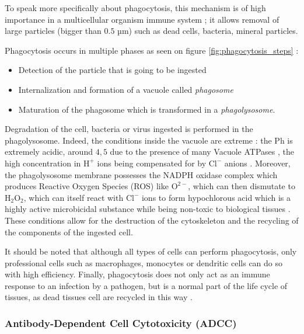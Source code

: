 To speak more specifically about phagocytosis, this mechanism is of high importance
in a multicellular organism immune system ; it allows removal of large particles
(bigger than $0.5$ µm) such as dead cells, bacteria, mineral particles.

Phagocytosis occurs in multiple phases \cite{uribe-querol_phagocytosis_2020}
as seen on figure \ref{fig:phagocytosis_steps} : 
\begin{itemize}
    \item Detection of the particle that is going to be ingested
    \item Internalization and formation of a vacuole called \emph{phagosome}
    \item Maturation of the phagosome which is transformed in a \emph{phagolysosome}.
\end{itemize}

Degradation of the cell, bacteria or virus ingested is performed in the phagolysosome.
Indeed, the conditions inside the vacuole are extreme : the Ph is extremely acidic,
around $4,5$ due to the presence of many Vacuole ATPases \cite{uribe-querol_phagocytosis_2020},
the high concentration in $\text{H}^+$ ions being compensated for
by $\text{Cl}^-$ anions \cite{gordon_phagocytosis_2016}. 
Moreover, the phagolysosome membrane possesses the NADPH oxidase complex 
which produces Reactive Oxygen Species (ROS) like $\text{O}^{2-}$, which can then
dismutate to $\text{H}_2\text{O}_2$, which can itself react with $\text{Cl}^-$ ions
to form hypochlorous acid which is a highly active microbicidal substance while
being non-toxic to biological tissues \cite{eryilmaz_antimicrobial_2013}.
These conditions allow for the destruction of the cytoskeleton and the 
recycling of the components of the ingested cell.


It should be noted that although all types of cells can perform phagocytosis,
only professional cells such as macrophages, monocytes or dendritic cells can
do so with high efficiency. Finally, phagocytosis does not only act as an
immune response to an infection by a pathogen, but is a normal part of the
life cycle of tissues, as dead tissues cell are recycled 
in this way \cite{arandjelovic_phagocytosis_2015}.

\subsubsection{Antibody-Dependent Cell Cytotoxicity (ADCC)}

